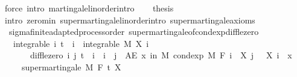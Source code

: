 \begin{isabellebody}
\ {\isacharparenleft}{\kern0pt}force\ intro{\isacharcolon}{\kern0pt}\ martingale{\isacharunderscore}{\kern0pt}linorder{\isachardot}{\kern0pt}intro{\isacharparenright}{\kern0pt}\isanewline
\ \ \isamarkupfalse%
\ {\isacharquery}{\kern0pt}thesis\ \isamarkupfalse%
\ {\isacharparenleft}{\kern0pt}intro\ zero{\isachardot}{\kern0pt}min\ supermartingale{\isacharunderscore}{\kern0pt}linorder{\isachardot}{\kern0pt}intro\ supermartingale{\isacharunderscore}{\kern0pt}axioms{\isacharparenright}{\kern0pt}\isanewline
{}\isamarkupfalse%
%
\endisatagproof
{\isafoldproof}%
%
\isadelimproof
\isanewline
%
\endisadelimproof
\isanewline
{}\isamarkupfalse%
\isanewline
\isanewline
{}\isamarkupfalse%
\ {\isacharparenleft}{\kern0pt}\ sigma{\isacharunderscore}{\kern0pt}finite{\isacharunderscore}{\kern0pt}adapted{\isacharunderscore}{\kern0pt}process{\isacharunderscore}{\kern0pt}order{\isacharparenright}{\kern0pt}\ supermartingale{\isacharunderscore}{\kern0pt}of{\isacharunderscore}{\kern0pt}cond{\isacharunderscore}{\kern0pt}exp{\isacharunderscore}{\kern0pt}diff{\isacharunderscore}{\kern0pt}le{\isacharunderscore}{\kern0pt}zero{\isacharcolon}{\kern0pt}\isanewline
\ \ \ integrable{\isacharcolon}{\kern0pt}\ {\isachardoublequoteopen}{\isasymAnd}i{\isachardot}{\kern0pt}\ t\ {\isasymle}\ i\ {\isasymLongrightarrow}\ integrable\ M\ {\isacharparenleft}{\kern0pt}X\ i{\isacharparenright}{\kern0pt}{\isachardoublequoteclose}\ \isanewline
\ \ \ \ \ \ \ diff{\isacharunderscore}{\kern0pt}le{\isacharunderscore}{\kern0pt}zero{\isacharcolon}{\kern0pt}\ {\isachardoublequoteopen}{\isasymAnd}i\ j{\isachardot}{\kern0pt}\ t\ {\isasymle}\ i\ {\isasymLongrightarrow}\ i\ {\isasymle}\ j\ {\isasymLongrightarrow}\ AE\ x\ in\ M{\isachardot}{\kern0pt}\ cond{\isacharunderscore}{\kern0pt}exp\ M\ {\isacharparenleft}{\kern0pt}F\ i{\isacharparenright}{\kern0pt}\ {\isacharparenleft}{\kern0pt}{\isasymlambda}{\isasymxi}{\isachardot}{\kern0pt}\ X\ j\ {\isasymxi}\ {\isacharminus}{\kern0pt}\ X\ i\ {\isasymxi}{\isacharparenright}{\kern0pt}\ x\ {\isasymle}\ {}{\isachardoublequoteclose}\isanewline
\ \ \ \ \ {\isachardoublequoteopen}supermartingale\ M\ F\ t\ X{\isachardoublequoteclose}\isanewline
%
\isadelimproof
%
\endisadelimproof
%
\isatagproof
{}\isamarkupfalse%
\ \isanewline
\ \ \isacommand{{\isacharbraceleft}{\kern0pt}}\isamarkupfalse%
\isanewline
\ \ \ \ \isamarkupfalse%

\end{isabellebody}
